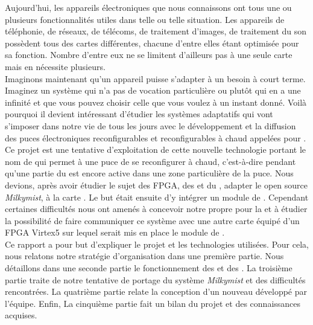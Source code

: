 Aujourd'hui, les appareils électroniques que nous connaissons ont tous une ou plusieurs fonctionnalités utiles dans telle ou telle situation. Les appareils de téléphonie, de  réseaux, de télécoms, de traitement d'images, de traitement du son possèdent tous des cartes différentes, chacune d'entre elles étant optimisée pour sa fonction. Nombre d'entre eux ne se limitent d'ailleurs pas à une seule carte mais en nécessite plusieurs.\\

Imaginons maintenant qu'un appareil puisse s'adapter à un besoin à court terme. Imaginez un système qui n'a pas de vocation particulière ou plutôt qui en a une infinité et que vous pouvez choisir celle que vous voulez à un instant donné. Voilà pourquoi il devient intéressant d'étudier les systèmes adaptatifs qui vont s'imposer dans notre vie de tous les jours avec le développement et la  diffusion des puces électroniques reconfigurables et reconfigurables à chaud appelées \fpgas{} pour .\\

Ce projet est une tentative d'exploitation de cette nouvelle technologie portant le nom de  qui permet à une puce \fpga{} de se reconfigurer à chaud, c'est-à-dire pendant qu'une partie du \fpga{} est encore active dans une zone particulière de la puce. Nous devions, après avoir étudier le sujet des FPGA, des  et du ,  adapter le  open source \textit{Milkymist}, à la carte \nexys{}.  Le but était ensuite d’y intégrer un module de . Cependant certaines difficultés nous ont amenés à concevoir notre propre  pour la \nexys{} et à étudier la possibilité de faire communiquer ce système avec une autre carte équipé d’un FPGA Virtex5 sur lequel serait mis en place le module de .\\

Ce rapport a pour but d’expliquer le projet et les technologies utilisées. Pour cela, nous relatons notre stratégie d’organisation dans une première partie. Nous détaillons dans une seconde partie le fonctionnement des \fpgas{} et des . La troisième partie traite de notre tentative de portage du système \textit{Milkymist} et des difficultés rencontrées. La quatrième partie relate la conception d'un nouveau  développé par l'équipe. Enfin, La cinquième partie fait un bilan du projet et des connaissances acquises.


